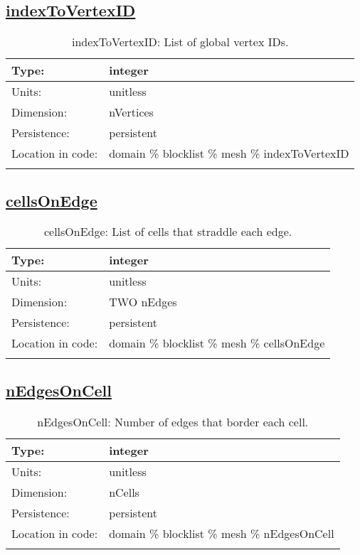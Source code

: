 \subsection[indexToVertexID]{\hyperref[sec:var_tab_mesh]{indexToVertexID}}
\label{subsec:var_sec_mesh_indexToVertexID}
\begin{center}
\begin{longtable}{| p{2.0in} | p{4.0in} |}
        \hline 
        Type: & integer \\
        \hline 
        Units: & \si{unitless} \\
        \hline 
        Dimension: & nVertices \\
        \hline 
        Persistence: & persistent \\
        \hline 
         Location in code: & domain \% blocklist \% mesh \% indexToVertexID \\
         \hline 
    \caption{indexToVertexID: List of global vertex IDs.}
\end{longtable}
\end{center}
\subsection[cellsOnEdge]{\hyperref[sec:var_tab_mesh]{cellsOnEdge}}
\label{subsec:var_sec_mesh_cellsOnEdge}
\begin{center}
\begin{longtable}{| p{2.0in} | p{4.0in} |}
        \hline 
        Type: & integer \\
        \hline 
        Units: & \si{unitless} \\
        \hline 
        Dimension: & TWO nEdges \\
        \hline 
        Persistence: & persistent \\
        \hline 
         Location in code: & domain \% blocklist \% mesh \% cellsOnEdge \\
         \hline 
    \caption{cellsOnEdge: List of cells that straddle each edge.}
\end{longtable}
\end{center}
\subsection[nEdgesOnCell]{\hyperref[sec:var_tab_mesh]{nEdgesOnCell}}
\label{subsec:var_sec_mesh_nEdgesOnCell}
\begin{center}
\begin{longtable}{| p{2.0in} | p{4.0in} |}
        \hline 
        Type: & integer \\
        \hline 
        Units: & \si{unitless} \\
        \hline 
        Dimension: & nCells \\
        \hline 
        Persistence: & persistent \\
        \hline 
         Location in code: & domain \% blocklist \% mesh \% nEdgesOnCell \\
         \hline 
    \caption{nEdgesOnCell: Number of edges that border each cell.}
\end{longtable}
\end{center}
